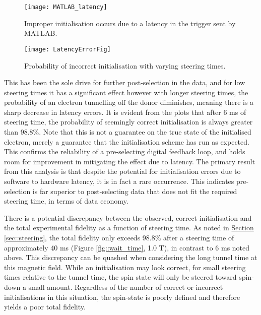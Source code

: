 	\begin{figure}[htbp!]
		\centering
		\texttt{[image: MATLAB\_latency]}
		\caption{Improper initialisation occurs due to a latency in the trigger sent by MATLAB.}
		\label{fig::latency}
	\end{figure}
	
	\begin{figure}[htb!]
		\centering
		\texttt{[image: LatencyErrorFig]}
		\caption{Probability of incorrect initialisation with varying steering times.}
		\label{fig::latency_errors}
	\end{figure}
	
	This has been the sole drive for further post-selection in the data, and for low steering times it has a significant effect however with longer steering times, the probability of an electron tunnelling off the donor diminishes, meaning there is a sharp decrease in latency errors. It is evident from the plots that after 6 ms of steering time, the probability of seemingly correct initialisation  is always greater than 98.8\%. Note that this is not a guarantee on the true state of the initialised electron, merely a guarantee that the initialisation scheme has run as expected. This confirms the reliability of a pre-selecting digital feedback loop, and holds room for improvement in mitigating the effect due to latency. The primary result from this analysis is that despite the potential for initialisation errors due to software to hardware latency, it is in fact a rare occurrence. This indicates pre-selection is far superior to post-selecting data that does not fit the required steering time, in terms of data economy. 
	
	There is a potential discrepancy between the observed, correct initialisation and the total experimental fidelity as a function of steering time. As noted in \hyperref[sec::steering]{Section \ref{sec::steering}}, the total fidelity only exceeds 98.8\% after a steering time of approximately 40 ms (Figure \ref{fig::wait_time}, 1.0 T), in contrast to 6 ms noted above. This discrepancy can be quashed when considering the long tunnel time at this magnetic field. While an initialisation may look correct, for small steering times relative to the tunnel time, the spin state will only be steered toward spin-down a small amount. Regardless of the number of correct or incorrect initialisations in this situation, the spin-state is poorly defined and therefore yields a poor total fidelity.
	